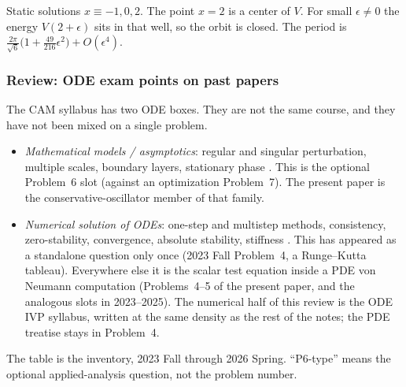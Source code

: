 \documentclass[11pt,a4paper]{article}
\begin{document}
\begin{summary}[Problem 6]
\label{sum:p6}
Static solutions \(x\equiv -1,0,2\). The point \(x=2\) is a center of \(V\). For small \(\epsilon\neq 0\) the energy \(V(2+\epsilon)\) sits in that well, so the orbit is closed. The period is \(\frac{2\pi}{\sqrt{6}}\bigl(1+\frac{49}{216}\epsilon^{2}\bigr)+O(\epsilon^{4})\).
\end{summary}

\subsubsection{Review: ODE exam points on past papers}
\label{sec:p6-ode-review}

The CAM syllabus has two ODE boxes. They are not the same course, and they have not been mixed on a single problem.

\begin{itemize}
    \item \emph{Mathematical models / asymptotics}: regular and singular perturbation, multiple scales, boundary layers, stationary phase \cite{bender99,nayfeh73}. This is the optional Problem~6 slot (against an optimization Problem~7). The present paper is the conservative-oscillator member of that family.
    \item \emph{Numerical solution of ODEs}: one-step and multistep methods, consistency, zero-stability, convergence, absolute stability, stiffness \cite{hairer93,hairer96,leveque07}. This has appeared as a standalone question only once (2023 Fall Problem~4, a Runge--Kutta tableau). Everywhere else it is the scalar test equation inside a PDE von Neumann computation (Problems~4--5 of the present paper, and the analogous slots in 2023--2025). The numerical half of this review is the ODE IVP syllabus, written at the same density as the rest of the notes; the PDE treatise stays in Problem~4.
\end{itemize}

The table is the inventory, 2023 Fall through 2026 Spring. ``P6-type'' means the optional applied-analysis question, not the problem number.
\end{document}
